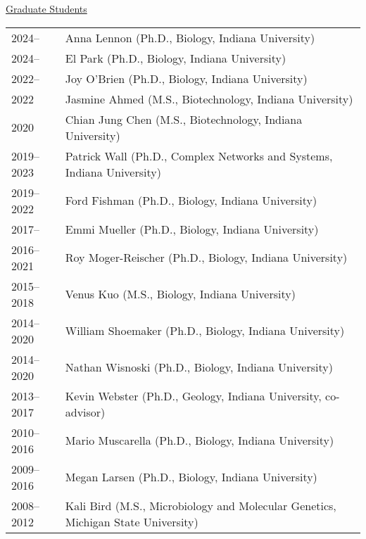 \documentclass[11pt]{article}
\begin{document}
\vspace{1em}
\textnormal{\underline{Graduate Students}} \\[-2.5em]

\begin{longtable}{@{}p{4em}@{\hspace{2em}}p{}@{}}
2024--     & Anna Lennon (Ph.D., Biology, Indiana University) \\
2024--     & El Park (Ph.D., Biology, Indiana University) \\
2022--     & Joy O’Brien (Ph.D., Biology, Indiana University) \\
2022       & Jasmine Ahmed (M.S., Biotechnology, Indiana University) \\
2020       & Chian Jung Chen (M.S., Biotechnology, Indiana University) \\
2019--2023 & Patrick Wall (Ph.D., Complex Networks and Systems, Indiana University) \\
2019--2022 & Ford Fishman (Ph.D., Biology, Indiana University) \\
2017--     & Emmi Mueller (Ph.D., Biology, Indiana University) \\
2016--2021 & Roy Moger-Reischer (Ph.D., Biology, Indiana University) \\
2015--2018 & Venus Kuo (M.S., Biology, Indiana University) \\
2014--2020 & William Shoemaker (Ph.D., Biology, Indiana University) \\
2014--2020 & Nathan Wisnoski (Ph.D., Biology, Indiana University) \\
2013--2017 & Kevin Webster (Ph.D., Geology, Indiana University, co-advisor) \\
2010--2016 & Mario Muscarella (Ph.D., Biology, Indiana University) \\
2009--2016 & Megan Larsen (Ph.D., Biology, Indiana University) \\
2008--2012 & Kali Bird (M.S., Microbiology and Molecular Genetics, Michigan State University) \\
\end{longtable}
\end{document}
